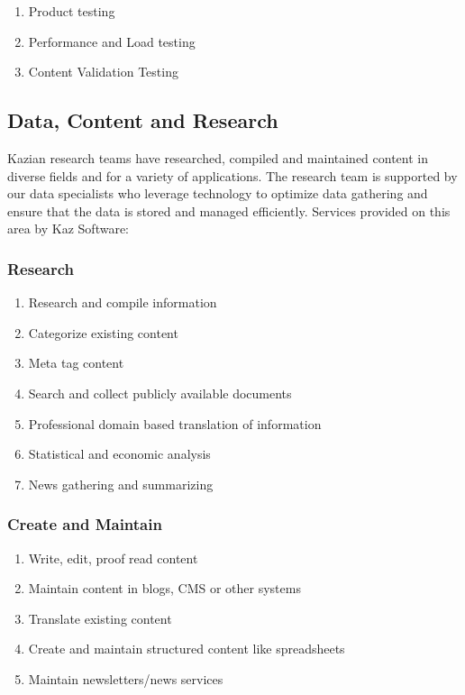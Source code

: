 \begin{enumerate}
    \item Product testing
    \item Performance and Load testing
    \item Content Validation Testing
\end{enumerate}

\subsection{Data, Content and Research}

Kazian research teams have researched, compiled and maintained content in diverse fields and for a variety of applications.
The research team is supported by our data specialists who leverage technology to optimize data gathering and ensure that the data is stored and managed efficiently.
Services provided on this area by Kaz Software:

\subsubsection*{Research}

\begin{enumerate}
    \item Research and compile information
    \item Categorize existing content
    \item Meta tag content
    \item Search and collect publicly available documents
    \item Professional domain based translation of information
    \item Statistical and economic analysis
    \item News gathering and summarizing
\end{enumerate}

\subsubsection*{Create and Maintain}

\begin{enumerate}
    \item Write, edit, proof read content
    \item Maintain content in blogs, CMS or other systems
    \item Translate existing content
    \item Create and maintain structured content like spreadsheets
    \item Maintain newsletters/news services
\end{enumerate}

